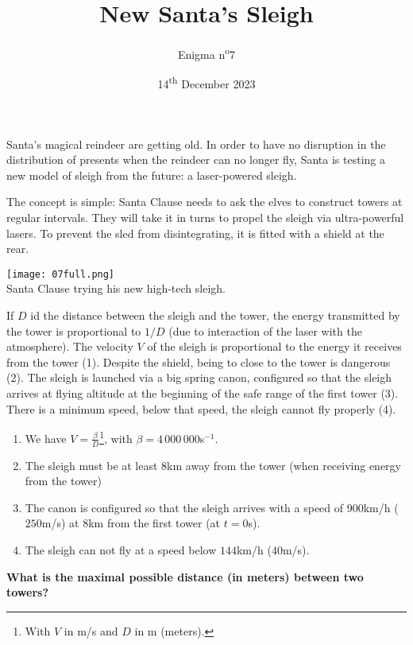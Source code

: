 \documentclass[a4paper, top=10mm]{article}
\title{\textbf{\huge{New Santa's Sleigh}}}
\author{Enigma n\textsuperscript{o}7}
\date{14\textsuperscript{th} December 2023}
\begin{document}
	\maketitle
	
	Santa's magical reindeer are getting old.
	In order to have no disruption in the distribution of presents when the reindeer can no longer fly, Santa is testing a new model of sleigh from the future: a laser-powered sleigh.
	
	The concept is simple: Santa Clause needs to ask the elves to construct towers at regular intervals.
	They will take it in turns to propel the sleigh via ultra-powerful lasers.
	To prevent the sled from disintegrating, it is fitted with a shield at the rear.
	
	\begin{center}
		\texttt{[image: 07full.png]}\\
		Santa Clause trying his new high-tech sleigh.
	\end{center}
	
	If $D$ id the distance between the sleigh and the tower, the energy transmitted by the tower is proportional to $1/D$ (due to interaction of the laser with the atmosphere).
	The velocity $V$ of the sleigh is proportional to the energy it receives from the tower (1).
	Despite the shield, being to close to the tower is dangerous (2).
	The sleigh is launched via a big spring canon, configured so that the sleigh arrives at flying altitude at the beginning of the safe range of the first tower (3).
	There is a minimum speed, below that speed, the sleigh cannot fly properly (4).
	
	\begin{enumerate}
		\item We have $V = \frac{\beta}{D}$\footnote{With $V$ in m/s and $D$ in m (meters).}, with $\beta=4\,000\,000$s$ ^{-1}$.
		\item The sleigh must be at least $8$km away from the tower (when receiving energy from the tower)
		\item The canon is configured so that the sleigh arrives with a speed of $900$km/h ($250$m/s) at $8$km from the first tower (at $t=0$s).
		\item The sleigh can not fly at a speed below $144$km/h ($40$m/s).
	\end{enumerate}
	
	\textbf{What is the maximal possible distance (in meters) between two towers?}
	
\end{document}
